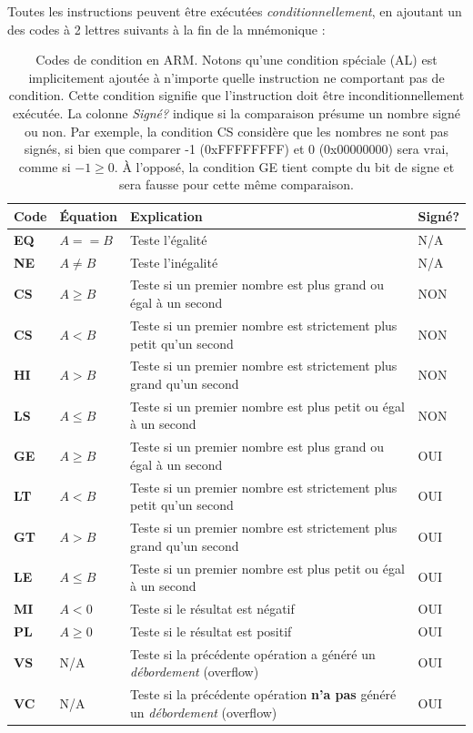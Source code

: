 \documentclass{tufte-handout}
\begin{document}
\noindent Toutes les instructions peuvent être exécutées \emph{conditionnellement}, en ajoutant un des codes à 2 lettres suivants à la fin de la mnémonique :
\vspace{-0.8em}
\begin{table}
\begin{tabular}{l|p{2cm}p{6cm}l}
Code & Équation & Explication & Signé? \\ \hline
\textbf{EQ}	& $A == B$ & Teste l'égalité & N/A \\
\textbf{NE}	& $A \neq B$ & Teste l'inégalité & N/A \\ \hline
\textbf{CS}	& $A \geq B$ & Teste si un premier nombre est plus grand ou égal à un second & NON \\
\textbf{CS}	& $A < B$ & Teste si un premier nombre est strictement plus petit qu'un second & NON \\
\textbf{HI}	& $A > B$ & Teste si un premier nombre est strictement plus grand qu'un second & NON \\
\textbf{LS}	& $A \leq B$ & Teste si un premier nombre est plus petit ou égal à un second & NON \\ \hline
\textbf{GE}	& $A \geq B$ & Teste si un premier nombre est plus grand ou égal à un second & OUI \\
\textbf{LT}	& $A < B$ & Teste si un premier nombre est strictement plus petit qu'un second & OUI \\
\textbf{GT}	& $A > B$ & Teste si un premier nombre est strictement plus grand qu'un second & OUI \\
\textbf{LE}	& $A \leq B$ & Teste si un premier nombre est plus petit ou égal à un second & OUI \\ \hline
\textbf{MI}	& $A < 0$ & Teste si le résultat est négatif & OUI \\
\textbf{PL}	& $A \geq 0$ & Teste si le résultat est positif & OUI \\ \hline
\textbf{VS}	& N/A & Teste si la précédente opération a généré un \textit{débordement} (overflow) & OUI \\
\textbf{VC}	& N/A & Teste si la précédente opération \textbf{n'a pas} généré un \textit{débordement} (overflow) & OUI \\ \hline
\end{tabular}
\caption{Codes de condition en ARM. Notons qu'une condition spéciale (AL) est implicitement ajoutée à n'importe quelle instruction ne comportant pas de condition. Cette condition signifie que l'instruction doit être inconditionnellement exécutée. La colonne \textit{Signé?} indique si la comparaison présume un nombre signé ou non. Par exemple, la condition CS considère que les nombres ne sont pas signés, si bien que comparer -1 (0xFFFFFFFF) et 0 (0x00000000) sera vrai, comme si $-1 \geq 0$. À l'opposé, la condition GE tient compte du bit de signe et sera fausse pour cette même comparaison.}
\end{table}
\end{document}
